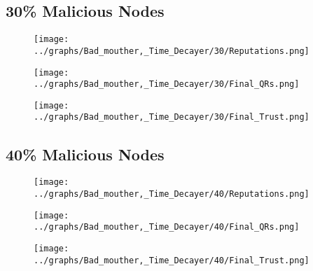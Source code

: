 \documentclass{article}
\begin{document}
  \begin{minipage}[t]{0.49\columnwidth}
    \subsection*{30\% Malicious Nodes}
        \begin{figure}[H]
            \centering
            \texttt{[image: ../graphs/Bad\_mouther,\_Time\_Decayer/30/Reputations.png]}
        \end{figure}
        \begin{figure}[H]
            \centering
            \texttt{[image: ../graphs/Bad\_mouther,\_Time\_Decayer/30/Final\_QRs.png]}
        \end{figure}
    \end{minipage}
    \begin{minipage}[t]{0.49\columnwidth}
        \begin{figure}[H]
            \centering
            \texttt{[image: ../graphs/Bad\_mouther,\_Time\_Decayer/30/Final\_Trust.png]}
        \end{figure}
    \end{minipage}

  \begin{minipage}[t]{0.49\columnwidth}
    \subsection*{40\% Malicious Nodes}
        \begin{figure}[H]
            \centering
            \texttt{[image: ../graphs/Bad\_mouther,\_Time\_Decayer/40/Reputations.png]}
        \end{figure}
        \begin{figure}[H]
            \centering
            \texttt{[image: ../graphs/Bad\_mouther,\_Time\_Decayer/40/Final\_QRs.png]}
        \end{figure}
    \end{minipage}
    \begin{minipage}[t]{0.49\columnwidth}
        \begin{figure}[H]
            \centering
            \texttt{[image: ../graphs/Bad\_mouther,\_Time\_Decayer/40/Final\_Trust.png]}
        \end{figure}
    \end{minipage}
\end{document}
